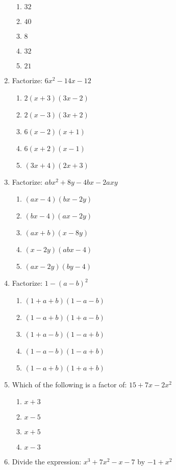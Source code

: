 \begin{multicols}{2}
\begin{enumerate}[label={\arabic*.}]
	\begin{enumerate}[label={\Alph*.}]
	\item \(32\)
	\item \(40\)
	\item \(8\)
	\item \(32\)
	\item \(21\)
	\end{enumerate}
\item Factorize: $6x^2 -14x - 12$
	\begin{enumerate}[label={\Alph*.}]
	\item \(2(x+3)(3x-2)\)
	\item \(2(x-3)(3x +2)\)
	\item \(6(x-2)(x+1)\)
	\item \(6(x+2)(x-1)\)
	\item \((3x+4)(2x+3)\)
	\end{enumerate}
\item Factorize: $abx^2 + 8y -4bx - 2axy$
	\begin{enumerate}[label={\Alph*.}]
	\item \((ax -4)(bx-2y)\)
	\item \((bx-4)(ax-2y)\)
	\item \((ax+b)(x-8y)\)
	\item \((x-2y)(abx-4)\)
	\item \((ax-2y)(by-4)\)
	\end{enumerate}
\item Factorize: $ 1- (a-b)^2$
	\begin{enumerate}[label={\Alph*.}]
	\item \((1 +a+b)(1-a-b)\)
	\item \((1-a + b)(1+ a -b)\)
	\item \((1 + a - b)(1-a+b)\)
	\item \((1 -a -b)(1-a + b)\)
	\item \((1 -a +b)(1+a + b)\)
	\end{enumerate}
\item Which of the following is a factor of: $15 + 7x -2x^2$
	\begin{enumerate}[label={\Alph*.}]
	\item \(x +3\)
	\item \(x-5\)
	\item \(x+5\)
	\item \(x-3\)
	\end{enumerate}
\item Divide the expression: $x^3 + 7x^2 -x -7$ by $-1 + x^2$
	\begin{enumerate}[label={\Alph*.}]

\end{enumerate}
\end{enumerate}
\end{multicols}
